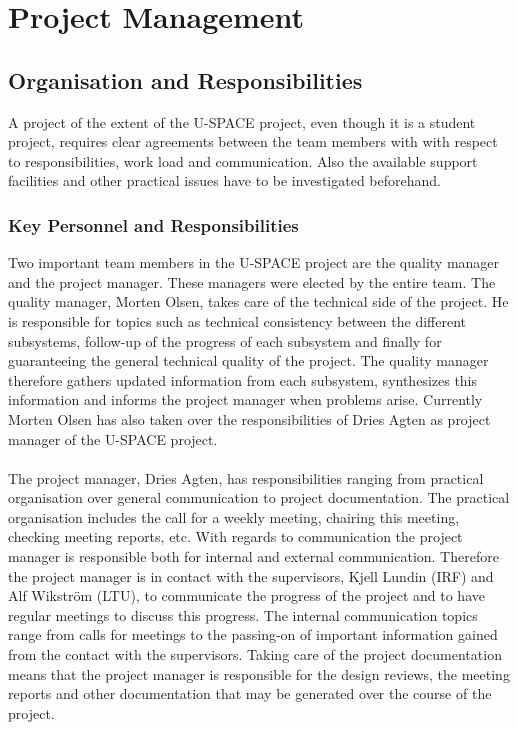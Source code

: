 \chapter{Project Management}
\label{chap:project_management}
%
\section{Organisation and Responsibilities}
%
A project of the extent of the \ac{U-SPACE} project, even though it is a student project, requires clear agreements between the team members with with respect to responsibilities, work load and communication. Also the available support facilities and other practical issues have to be investigated beforehand.
%
\subsection{Key Personnel and Responsibilities}
%
Two important team members in the \ac{U-SPACE} project are the quality manager and the project manager. These managers were elected by the entire team. The quality manager, Morten Olsen, takes care of the technical side of the project. He is responsible for topics such as technical consistency between the different subsystems, follow-up of the progress of each subsystem and finally for guaranteeing the general technical quality of the project. The quality manager therefore gathers updated information from each subsystem, synthesizes this information and informs the project manager when problems arise. Currently Morten Olsen has also taken over the responsibilities of Dries Agten as project manager of the \ac{U-SPACE} project.
\\
\\
The project manager, Dries Agten, has responsibilities ranging from practical organisation over general communication to project documentation. The practical organisation includes the call for a weekly meeting, chairing this meeting, checking meeting reports, etc. With regards to communication the project manager is responsible both for internal and external communication. Therefore the project manager is in contact with the supervisors, Kjell Lundin (\ac{IRF}) and Alf Wikström (\ac{LTU}), to communicate the progress of the project and to have regular meetings to discuss this progress.  The internal communication topics range from calls for meetings to the passing-on of important information gained from the contact with the supervisors. Taking care of the project documentation means that the project manager is responsible for the design reviews, the meeting reports and other documentation that may be generated over the course of the project.
%
